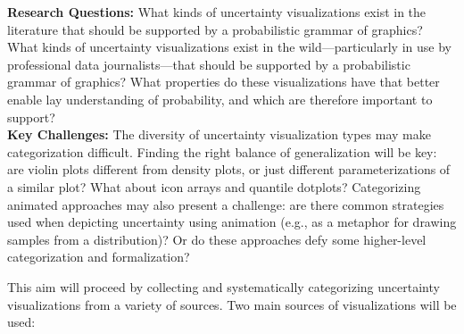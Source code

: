 \documentclass[11pt]{article}
\begin{document}
\noindent\textbf{Research Questions:}
What kinds of uncertainty visualizations exist in the literature that should be supported by a probabilistic grammar of graphics? What kinds of uncertainty visualizations exist in the wild---particularly in use by professional data journalists---that should be supported by a probabilistic grammar of graphics? What properties do these visualizations have that better enable lay understanding of probability, and which are therefore important to support?
\\
\noindent\textbf{Key Challenges:}
The diversity of uncertainty visualization types may make categorization difficult. Finding the right balance of generalization will be key: are violin plots \cite{correll2014error} different from density plots, or just different parameterizations of a similar plot? What about icon arrays and quantile dotplots? Categorizing animated approaches may also present a challenge: are there common strategies used when depicting uncertainty using animation (e.g., as a metaphor for drawing samples from a distribution)? Or do these approaches defy some higher-level categorization and formalization?

\vspace{-1.0em}
\noindent\hrulefill

\noindent This aim will proceed by collecting and systematically categorizing uncertainty visualizations from a variety of sources. Two main sources of visualizations will be used: 
\end{document}
